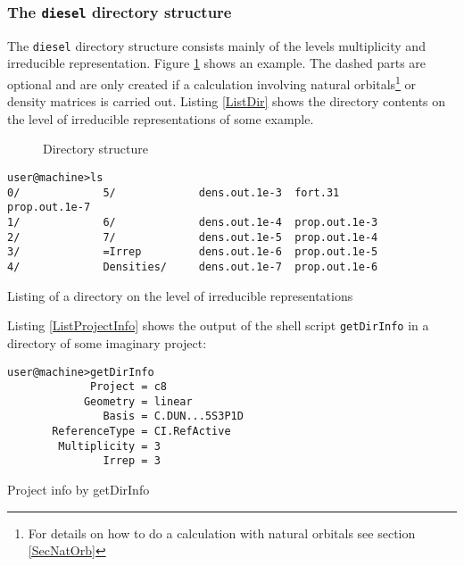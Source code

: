 \subsubsection{The {\tt diesel} directory structure} 
The {\tt diesel} directory structure consists mainly of the levels
multiplicity and irreducible representation. Figure \ref{FigDirLevels}
shows an example. The dashed parts are optional and are only created if a
calculation involving natural orbitals\footnote{For details
on how to do a calculation with natural orbitals see section
\ref{SecNatOrb}} or density matrices is carried out. Listing \ref{ListDir}
shows the directory contents on the level of irreducible representations
of some example.

\begin{figure}[h]
\begin{center}

\caption{\label{FigDirLevels}
Directory structure}
\end{center}
\end{figure}

\begin{prog}
\begin{verbatim}
user@machine>ls
0/             5/             dens.out.1e-3  fort.31        prop.out.1e-7
1/             6/             dens.out.1e-4  prop.out.1e-3
2/             7/             dens.out.1e-5  prop.out.1e-4
3/             =Irrep         dens.out.1e-6  prop.out.1e-5
4/             Densities/     dens.out.1e-7  prop.out.1e-6
\end{verbatim}
\vspace{-9pt}
\caption{\label{ListDir} Listing of a directory on the level of irreducible representations}
\end{prog}

Listing \ref{ListProjectInfo} shows the output of the shell script
{\tt getDirInfo} in a directory of some imaginary project:

\begin{prog}
\begin{verbatim}
user@machine>getDirInfo
             Project = c8
            Geometry = linear
               Basis = C.DUN...5S3P1D
       ReferenceType = CI.RefActive
        Multiplicity = 3
               Irrep = 3
\end{verbatim}
\vspace{-9pt}
\caption{\label{ListProjectInfo} Project info by getDirInfo}
\end{prog}


 
 
